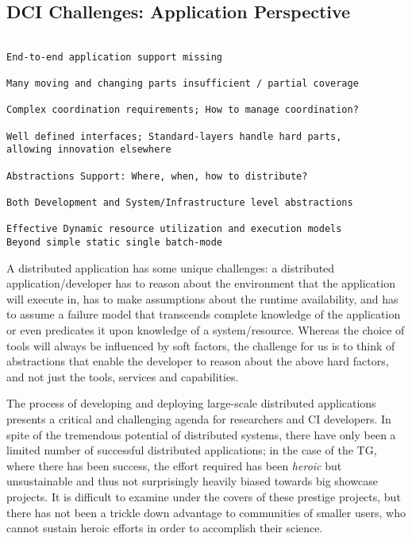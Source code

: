\documentclass[a4paper,10pt]{article}
\begin{document}
\subsection{DCI Challenges: Application Perspective}

\begin{verbatim}

End-to-end application support missing

Many moving and changing parts insufficient / partial coverage

Complex coordination requirements; How to manage coordination?

Well defined interfaces; Standard-layers handle hard parts, 
allowing innovation elsewhere

Abstractions Support: Where, when, how to distribute? 

Both Development and System/Infrastructure level abstractions

Effective Dynamic resource utilization and execution models
Beyond simple static single batch-mode

\end{verbatim}

A distributed application has some unique challenges: a distributed
 application/developer has to reason about the environment that the
 application will execute in, has to make assumptions about the
 runtime availability, and has to assume a failure model that
 transcends complete knowledge of the application or even predicates
 it upon knowledge of a system/resource.  Whereas the choice of tools
 will always be influenced by soft factors, the challenge for us is to
 think of abstractions that enable the developer to reason about the
 above hard factors, and not just the tools, services and
 capabilities.

The process of developing and deploying large-scale distributed
 applications presents a critical and challenging agenda for
 researchers and CI developers.  In spite of the tremendous potential
 of distributed systems, there have only been a limited number of
 successful distributed applications; in the case of the TG, where
 there has been success, the effort required has been {\it heroic} but
 unsustainable and thus not surprisingly heavily biased towards big
 showcase projects. It is difficult to examine under the covers of
 these prestige projects, but there has not been a trickle down
 advantage to communities of smaller users, who cannot sustain heroic
 efforts in order to accomplish their science.
\end{document}
